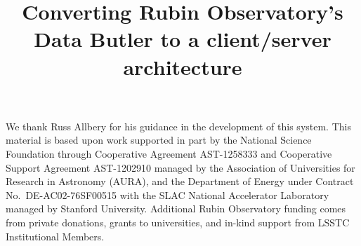 \documentclass[]{spie}
\begin{document}

\title{Converting Rubin Observatory's Data Butler to a client/server architecture}

\maketitle






\acknowledgments

We thank Russ Allbery for his guidance in the development of this system.
This material is based upon work supported in part by the National Science Foundation through Cooperative Agreement AST-1258333 and Cooperative Support Agreement AST-1202910 managed by the Association of Universities for Research in Astronomy (AURA), and the Department of Energy under Contract No.\ DE-AC02-76SF00515 with the SLAC National Accelerator Laboratory managed by Stanford University.
Additional Rubin Observatory funding comes from private donations, grants to universities, and in-kind support from LSSTC Institutional Members.



\end{document}
